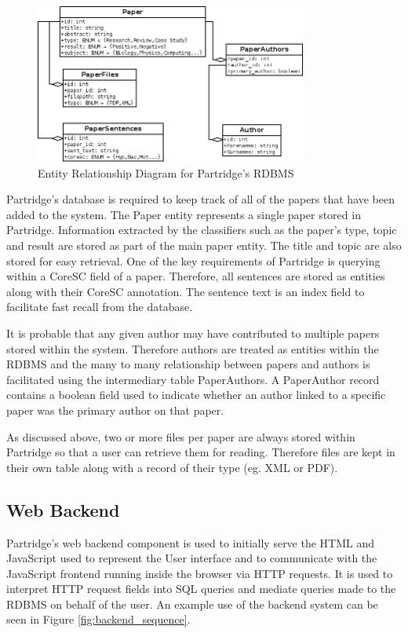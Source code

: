 \begin{figure}[th]
\vspace{5mm}
\centering
\includegraphics[width=0.8\textwidth]{images/design/e-r-diagram.png}
\caption{Entity Relationship Diagram for Partridge's RDBMS}
\label{fig:e-r-diagram}
\end{figure}

Partridge's database is required to keep track of all of the papers that have
been added to the system. The Paper entity represents a single paper stored in
Partridge. Information extracted by the classifiers such as the paper's type,
topic and result are stored as part of the main paper entity. The title and
topic are also stored for easy retrieval. One of the key requirements of
Partridge is querying within a CoreSC field of a paper. Therefore, all
sentences are stored as entities along with their CoreSC annotation. The sentence
text is an index field to facilitate fast recall from the database.

It is probable that any given author may have contributed to multiple papers
stored within the system.  Therefore authors are treated as entities within the
RDBMS and the many to many relationship between papers and authors is
facilitated using the intermediary table PaperAuthors. A PaperAuthor record
contains a boolean field used to indicate whether an author linked to a
specific paper was the primary author on that paper.

As discussed above, two or more files per paper are always stored within
Partridge so that a user can retrieve them for reading. Therefore files are
kept in their own table along with a record of their type (eg. XML or PDF). 

\subsection{ Web Backend }

Partridge's web backend component is used to initially serve the HTML and
JavaScript used to represent the User interface and to communicate with the
JavaScript frontend running inside the browser via HTTP requests. It is used to
interpret HTTP request fields into SQL queries and mediate queries made to the
RDBMS on behalf of the user. An example use of the backend system can be seen
in Figure \ref{fig:backend_sequence}.

